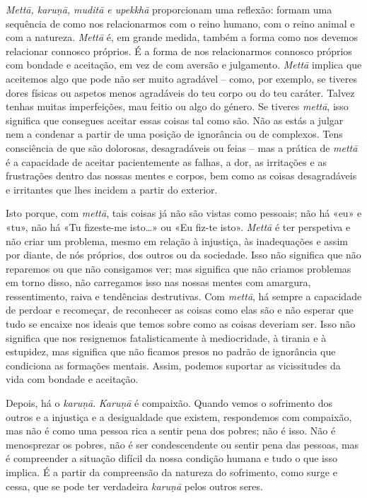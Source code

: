 \emph{Mettā, karuṇā, muditā e upekkhā} proporcionam uma reflexão: formam uma
sequência de como nos relacionarmos com o reino humano, com o reino animal e com
a natureza. \emph{Mettā} é, em grande medida, também a forma como nos devemos
relacionar connosco próprios. É a forma de nos relacionarmos connosco próprios
com bondade e aceitação, em vez de com aversão e julgamento. \emph{Mettā}
implica que aceitemos algo que pode não ser muito agradável -- como, por
exemplo, se tiveres dores físicas ou aspetos menos agradáveis do teu corpo ou do
teu caráter. Talvez tenhas muitas imperfeições, mau feitio ou algo do género. Se
tiveres \emph{mettā}, isso significa que consegues aceitar essas coisas tal como
são. Não as estás a julgar nem a condenar a partir de uma posição de ignorância
ou de complexos. Tens consciência de que são dolorosas, desagradáveis ou feias
-- mas a prática de \emph{mettā} é a capacidade de aceitar pacientemente as
falhas, a dor, as irritações e as frustrações dentro das nossas mentes e corpos,
bem como as coisas desagradáveis e irritantes que lhes incidem a partir do
exterior.

Isto porque, com \emph{mettā}, tais coisas já não são vistas como pessoais; não
há «eu» e «tu», não há «Tu fizeste-me isto\ldots{}» ou «Eu fiz-te isto».
\emph{Mettā} é ter perspetiva e não criar um problema, mesmo em relação à
injustiça, às inadequações e assim por diante, de nós próprios, dos outros ou da
sociedade. Isso não significa que não reparemos ou que não consigamos ver; mas
significa que não criamos problemas em torno disso, não carregamos isso nas
nossas mentes com amargura, ressentimento, raiva e tendências destrutivas. Com
\emph{mettā}, há sempre a capacidade de perdoar e recomeçar, de reconhecer as
coisas como elas são e não esperar que tudo se encaixe nos ideais que temos
sobre como as coisas deveriam ser. Isso não significa que nos resignemos
fatalisticamente à mediocridade, à tirania e à estupidez, mas significa que não
ficamos presos no padrão de ignorância que condiciona as formações mentais.
Assim, podemos suportar as vicissitudes da vida com bondade e aceitação.

Depois, há o \emph{karuṇā}. \emph{Karuṇā} é compaixão. Quando vemos o sofrimento dos
outros e a injustiça e a desigualdade que existem, respondemos com compaixão,
mas não é como uma pessoa rica a sentir pena dos pobres; não é isso. Não é
menosprezar os pobres, não é ser condescendente ou sentir pena das pessoas, mas
é compreender a situação difícil da nossa condição humana e tudo o que isso
implica. É a partir da compreensão da natureza do sofrimento, como surge e
cessa, que se pode ter verdadeira \emph{karuṇā} pelos outros seres.

